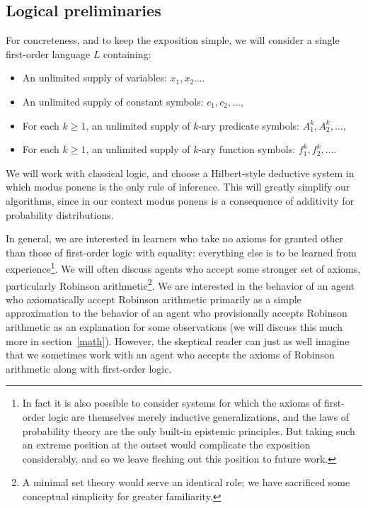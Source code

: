 \documentclass[12pt]{article}
\theoremstyle{definition}
\begin{document}
\subsection{Logical preliminaries}

For concreteness, and to keep the exposition simple,
we will consider a single first-order language $L$ containing:
\begin{itemize}
\item An unlimited supply of variables: $x_1, x_2 \ldots$.
\item An unlimited supply of constant symbols: $c_1, c_2, \ldots$,
\item For each $k \geq 1$, an unlimited supply of $k$-ary predicate symbols:
$A^k_1, A^k_2, \ldots$,
\item For each $k \geq 1$, an unlimited supply of $k$-ary function symbols:
$f^k_1, f^k_2, \ldots$.
\end{itemize}

We will work with classical logic,
and choose a Hilbert-style deductive system in which
modus ponens is the only rule of inference.
This will greatly simplify our algorithms,
since in our context modus ponens is a consequence
of additivity for probability distributions.

In general, we are interested in learners
who take no axioms for granted other than those of first-order logic
with equality: everything else is to be learned from experience\footnote{In fact
 it is also possible to consider systems for which the axioms of first-order logic
 are themselves merely inductive generalizations, and the laws of probability theory
 are the only built-in epistemic principles.
 But taking such an extreme
 position at the outset would complicate the exposition considerably,
 and so we leave fleshing out this position to future work.
}.  We will often discuss agents who accept some stronger set of axioms,
particularly Robinson arithmetic\footnote{A minimal set theory would serve an identical role;
 we have sacrificed some conceptual simplicity for greater familiarity.}. %
We are interested in the behavior of an agent who axiomatically accept Robinson arithmetic
primarily as a simple approximation to the behavior of an agent who provisionally
accepts Robinson arithmetic
as an explanation for some observations (we will discuss this much more
in section~\ref{math}).
However, the skeptical reader can just as well imagine that we sometimes
work with an agent who accepts the axioms of Robinson arithmetic along with first-order logic.
\end{document}
